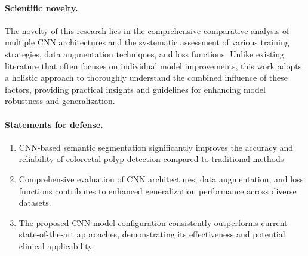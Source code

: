 \paragraph{Scientific novelty.}
The novelty of this research lies in the comprehensive comparative analysis of multiple CNN architectures and the systematic assessment of various training strategies, data augmentation techniques, and loss functions. Unlike existing literature that often focuses on individual model improvements, this work adopts a holistic approach to thoroughly understand the combined influence of these factors, providing practical insights and guidelines for enhancing model robustness and generalization.

\paragraph{Statements for defense.}
\begin{enumerate}
\item CNN-based semantic segmentation significantly improves the accuracy and reliability of colorectal polyp detection compared to traditional methods.
\item Comprehensive evaluation of CNN architectures, data augmentation, and loss functions contributes to enhanced generalization performance across diverse datasets.
\item The proposed CNN model configuration consistently outperforms current state-of-the-art approaches, demonstrating its effectiveness and potential clinical applicability.
\end{enumerate}